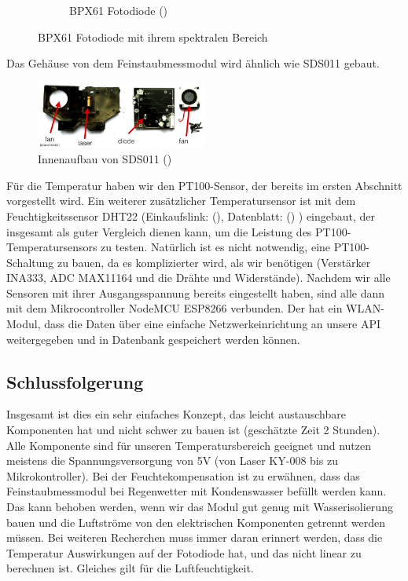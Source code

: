 \documentclass[12pt]{article}
\begin{document}
\begin{figure}[h!]
\begin{subfigure}[b]{0.45\linewidth}
    \caption{BPX61 Fotodiode (\cite{Conrad.8312021})}
  \end{subfigure}
  \caption{BPX61 Fotodiode mit ihrem spektralen Bereich} 
  \label{fig:bpx61}
\end{figure}

Das Gehäuse von dem Feinstaubmessmodul wird ähnlich wie SDS011 gebaut. 

\begin{figure}[h!]
  \centering
  \label{fig:sds011innen}
  \includegraphics[width=0.5\textwidth]{sds011innen}
  \caption{Innenaufbau von SDS011 (\cite{TheWorldAirQualityIndex.6202021})}
\end{figure}

Für die Temperatur haben wir den PT100-Sensor, der bereits im ersten Abschnitt vorgestellt wird. Ein weiterer zusätzlicher Temperatursensor ist mit dem Feuchtigkeitssensor DHT22 (Einkaufslink: (\cite{DHT22Kaufen}), Datenblatt: (\cite{AZDelivery.2021}) ) eingebaut, der insgesamt als guter Vergleich dienen kann, um die Leistung des PT100-Temperatursensors zu testen. Natürlich ist es nicht notwendig, eine PT100-Schaltung zu bauen, da es komplizierter wird, als wir benötigen (Verstärker INA333, ADC MAX11164 und die Drähte und Widerstände). Nachdem wir alle Sensoren mit ihrer Ausgangsspannung bereits eingestellt haben, sind alle dann mit dem Mikrocontroller NodeMCU ESP8266 verbunden. Der hat ein WLAN-Modul, dass die Daten über eine einfache Netzwerkeinrichtung an unsere API weitergegeben und in Datenbank gespeichert werden können.

\subsection{Schlussfolgerung}
Insgesamt ist dies ein sehr einfaches Konzept, das leicht austauschbare Komponenten hat und nicht schwer zu bauen ist (geschätzte Zeit 2 Stunden). Alle Komponente sind für unseren Temperatursbereich geeignet und nutzen meistens die Spannungsversorgung von 5V (von Laser KY-008 bis zu Mikrokontroller). Bei der Feuchtekompensation ist zu erwähnen, dass das Feinstaubmessmodul bei Regenwetter mit Kondenswasser befüllt werden kann. Das kann behoben werden, wenn wir das Modul gut genug mit Wasserisolierung bauen und die Luftströme von den elektrischen Komponenten getrennt werden müssen. Bei weiteren Recherchen muss immer daran erinnert werden, dass die Temperatur Auswirkungen auf der Fotodiode hat, und das nicht linear zu berechnen ist. Gleiches gilt für die Luftfeuchtigkeit.
\end{document}
